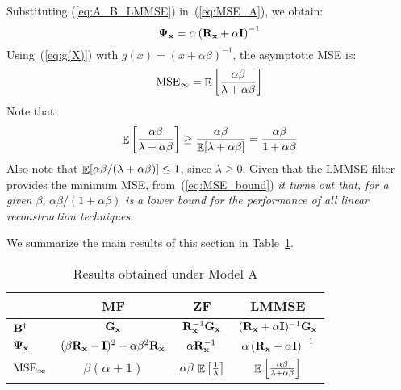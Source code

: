 \documentclass[final, a4paper]{IEEEtran}
\newcommand{\xv}{{\bf x}}
\newcommand{\Bm}{{\bf B}}
\newcommand{\Gm}{{\bf G}}
\newcommand{\Id}{{\bf I}}
\newcommand{\Rm}{{\bf R}}
\newcommand{\Psim}{\hbox{\boldmath$\Psi$}}
\def\MSEinf{{\rm MSE}_{\infty}}
\begin{document}
Substituting (\ref{eq:A_B_LMMSE}) in~(\ref{eq:MSE_A}), we obtain:
\begin{equation}
\Psim_\xv = \alpha\left(\Rm_\xv+\alpha\Id\right)^{-1}
\label{eq:MSE_A_LMMSE}
\end{equation}
Using~(\ref{eq:g(X)}) with $g(x)=(x+\alpha\beta)^{-1}$, the asymptotic MSE is:
\begin{equation}
\MSEinf = \EE\left[\frac{\alpha\beta}{\lambda+\alpha\beta}\right]
\label{eq:MSEinf_A_LMMSE}
\end{equation}
Note that:
\begin{equation}
\mathop{\mathbb{E}}\limits\left[\frac{\alpha\beta}{\lambda+\alpha\beta}\right] \ge \frac{\alpha\beta}{\mathop{\mathbb{E}}\limits[\lambda+\alpha\beta]}
=\frac{\alpha\beta}{1+\alpha\beta}
\label{eq:MSE_bound}
\end{equation}
Also note that $\mathop{\mathbb{E}}\limits[\alpha\beta/(\lambda+\alpha\beta)] \le 1$, since
$\lambda\geq 0$. Given that the LMMSE filter provides the minimum
MSE, from~(\ref{eq:MSE_bound}) {\em it turns out that, for a given $\beta$},
$\alpha\beta/(1+\alpha\beta)$ {\em is a lower
bound for the performance of all linear reconstruction techniques}.


We summarize the main results of this section in Table~\ref{table:results-modelA}.

\begin{table}
\begin{center}
\caption{Results obtained under Model A \label{table:results-modelA}}
\begin{tabular}{|l||c|c|c|} \hline
              & \rule[-1.5mm]{0mm}{5mm} { MF} &  { ZF} & { LMMSE} \\ \hline \hline
 $\Bm\Herm$   & $\Gm_\xv$&  \rule[-2mm]{0mm}{6mm} $\Rm_\xv^{-1}\Gm_\xv$ & $(\Rm_\xv +\alpha\Id)^{-1}\Gm_\xv$  \\ \hline
$\Psim_\xv$  &   $(\beta\Rm_\xv-\Id)^2+\alpha\beta^2\Rm_\xv$ &
              \rule[-2mm]{0mm}{6mm} $\alpha\Rm_\xv^{-1}$
              & $\alpha\left(\Rm_\xv+\alpha\Id\right)^{-1}$ \\ \hline
$\MSEinf$    & $\beta(\alpha+1)$ &
              \rule[-2mm]{0mm}{6mm} $\alpha\beta\,\mathop{\mathbb{E}}\limits\left[\frac{1}{\lambda}\right]$
              & $\mathop{\mathbb{E}}\limits\left[\frac{\alpha\beta}{\lambda+\alpha\beta}\right]$ \\ \hline
\end{tabular}
\end{center}
\end{table}
\end{document}
